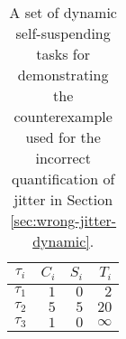 \begin{table}[t]
\begin{center}
\begin{tabular}{|c|r|r|r|}
\hline
$\tau_i$ &      $C_i$   &   $S_i$  &     $T_i$     \\ \hline
$\tau_1$ &       $1$   &     $0$  &       $2$     \\ \hline
$\tau_2$  &      $5$   &     $5$  &      $20$     \\ \hline
$\tau_3$  &      $1$   &     $0$  &  $\infty$     \\ \hline
\end{tabular}
\end{center}
\caption{A set of dynamic self-suspending tasks for demonstrating the counterexample used for
  the incorrect quantification of jitter in Section \ref{sec:wrong-jitter-dynamic}.}
\label{tab:counterexample-dynamic-suspension}
\end{table}



